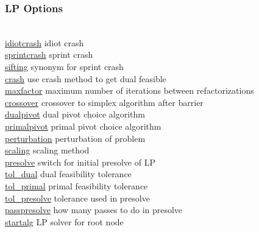 \subsubsection{LP Options}
\begin{tabbing}
\hspace {1.3in} \= \\
\hyperlink{idiotcrash}
{idiotcrash} \> idiot crash \\
\hyperlink{sprintcrash}
{sprintcrash} \> sprint crash \\
\hyperlink{sifting}
{sifting} \> synonym for sprint crash \\
\hyperlink{crash}
{crash} \> use crash method to get dual feasible \\
\hyperlink{maxfactor}
{maxfactor} \> maximum number of iterations between refactorizations \\
\hyperlink{crossover}
{crossover} \> crossover to simplex algorithm after barrier \\
\hyperlink{dualpivot}
{dualpivot} \> dual pivot choice algorithm \\
\hyperlink{primalpivot}
{primalpivot} \> primal pivot choice algorithm \\
\hyperlink{perturbation}
{perturbation} \> perturbation of problem \\
\hyperlink{scaling}
{scaling} \> scaling method \\
\hyperlink{presolve}
{presolve} \> switch for initial presolve of LP \\
\hyperlink{tol_dual}
{tol\_dual} \> dual feasibility tolerance \\
\hyperlink{tol_primal}
{tol\_primal} \> primal feasibility tolerance \\
\hyperlink{tol_presolve}
{tol\_presolve} \> tolerance used in presolve \\
\hyperlink{passpresolve}
{passpresolve} \> how many passes to do in presolve \\
\hyperlink{startalg}
{startalg} \> LP solver for root node
\end{tabbing}


